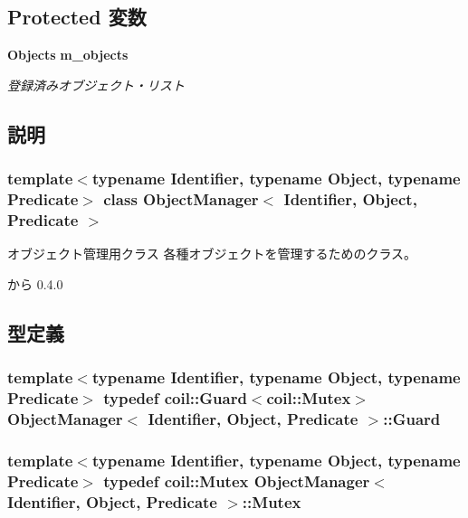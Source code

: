 \subsection*{Protected 変数}
\begin{DoxyCompactItemize}
\item 
{\bf Objects} {\bf m\_\-objects}
\begin{DoxyCompactList}\small\item\em 登録済みオブジェクト・リスト \item\end{DoxyCompactList}\end{DoxyCompactItemize}


\subsection{説明}
\subsubsection*{template$<$typename Identifier, typename Object, typename Predicate$>$ class ObjectManager$<$ Identifier, Object, Predicate $>$}

オブジェクト管理用クラス 各種オブジェクトを管理するためのクラス。

\begin{DoxySince}{から}
0.4.0 
\end{DoxySince}


\subsection{型定義}
\subsubsection[{Guard}]{\setlength{\rightskip}{0pt plus 5cm}template$<$typename Identifier, typename Object, typename Predicate$>$ typedef {\bf coil::Guard}$<${\bf coil::Mutex}$>$ {\bf ObjectManager}$<$ Identifier, Object, Predicate $>$::{\bf Guard}}\label{classObjectManager_a269f7c04878a5ad6759d2ff21a21c4d1}
\subsubsection[{Mutex}]{\setlength{\rightskip}{0pt plus 5cm}template$<$typename Identifier, typename Object, typename Predicate$>$ typedef {\bf coil::Mutex} {\bf ObjectManager}$<$ Identifier, Object, Predicate $>$::{\bf Mutex}}\label{classObjectManager_aace44eee2c2a6ddfec63ac42b7bf601c}
